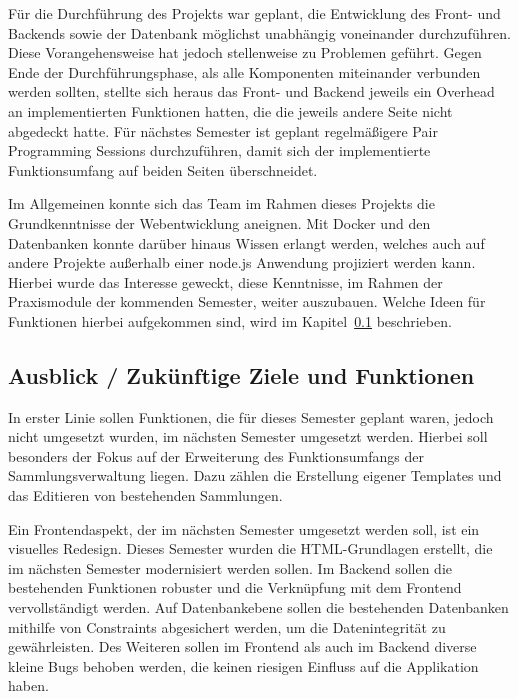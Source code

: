 Für die Durchführung des Projekts war geplant, die Entwicklung des Front- und Backends sowie der Datenbank möglichst unabhängig voneinander durchzuführen.
Diese Vorangehensweise hat jedoch stellenweise zu Problemen geführt.
Gegen Ende der Durchführungsphase, als alle Komponenten miteinander verbunden werden sollten, stellte sich heraus das Front- und Backend jeweils ein Overhead an implementierten Funktionen hatten, die die jeweils andere Seite nicht abgedeckt hatte.
Für nächstes Semester ist geplant regelmäßigere Pair Programming Sessions durchzuführen, damit sich der implementierte Funktionsumfang auf beiden Seiten überschneidet.

Im Allgemeinen konnte sich das Team im Rahmen dieses Projekts die Grundkenntnisse der Webentwicklung aneignen.
Mit Docker und den Datenbanken konnte darüber hinaus Wissen erlangt werden, welches auch auf andere Projekte außerhalb einer node.js Anwendung projiziert werden kann.
Hierbei wurde das Interesse geweckt, diese Kenntnisse, im Rahmen der Praxismodule der kommenden Semester, weiter auszubauen.
Welche Ideen für Funktionen hierbei aufgekommen sind, wird im Kapitel~\ref{subsec:ausblick-zukuenftige-ziele-und-funktionen} beschrieben.

\subsection{Ausblick / Zukünftige Ziele und Funktionen}\label{subsec:ausblick-zukuenftige-ziele-und-funktionen}

In erster Linie sollen Funktionen, die für dieses Semester geplant waren, jedoch nicht umgesetzt wurden, im nächsten Semester umgesetzt werden.
Hierbei soll besonders der Fokus auf der Erweiterung des Funktionsumfangs der Sammlungsverwaltung liegen.
Dazu zählen die Erstellung eigener Templates und das Editieren von bestehenden Sammlungen.

Ein Frontendaspekt, der im nächsten Semester umgesetzt werden soll, ist ein visuelles Redesign.
Dieses Semester wurden die HTML-Grundlagen erstellt, die im nächsten Semester modernisiert werden sollen.
Im Backend sollen die bestehenden Funktionen robuster und die Verknüpfung mit dem Frontend vervollständigt werden.
Auf Datenbankebene sollen die bestehenden Datenbanken mithilfe von Constraints abgesichert werden, um die Datenintegrität zu gewährleisten.
Des Weiteren sollen im Frontend als auch im Backend diverse kleine Bugs behoben werden, die keinen riesigen Einfluss auf die Applikation haben.

